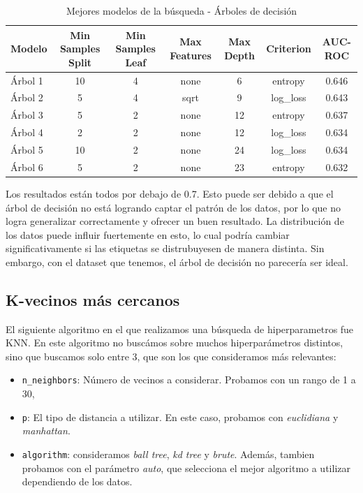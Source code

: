 \begin{table}[H]
    \centering
    \begin{tabular}{|l|c|c|c|c|c|c|}
    \hline
    \textbf{Modelo} & \textbf{Min Samples Split} & \textbf{Min Samples Leaf} & \textbf{Max Features} & \textbf{Max Depth} & \textbf{Criterion} & \textbf{AUC-ROC} \\
    \hline
    \rowcolor{yellow!30}
    Árbol 1 & 10 & 4 & none & 6 & entropy & 0.646 \\
    Árbol 2 & 5 & 4 & sqrt & 9 & log\_loss & 0.643 \\
    Árbol 3 & 5 & 2 & none & 12 & entropy & 0.637 \\
    Árbol 4 & 2 & 2 & none & 12 & log\_loss & 0.634 \\
    Árbol 5 & 10 & 2 & none & 24 & log\_loss & 0.634 \\
    Árbol 6 & 5 & 2 & none & 23 & entropy & 0.632 \\
    \hline
    \end{tabular}
    \caption*{Mejores modelos de la búsqueda - Árboles de decisión}
    \label{tab:hiperparametros-arboles-tabla}
\end{table}

Los resultados están todos por debajo de 0.7. Esto puede ser debido a que
el árbol de decisión no está logrando captar el patrón de los datos, por lo que no logra generalizar correctamente y
ofrecer un buen resultado. La distribución de los datos puede influir fuertemente en esto, lo cual podría cambiar significativamente
si las etiquetas se distrubuyesen de manera distinta. Sin embargo, con el dataset que tenemos, el árbol de decisión no parecería ser ideal.
\subsection*{K-vecinos más cercanos}

El siguiente algoritmo en el que realizamos una búsqueda de hiperparametros fue KNN. En este algoritmo no buscámos sobre
muchos hiperparámetros distintos, sino que buscamos solo entre 3, que son los que consideramos más relevantes:
\begin{itemize}
    \item \texttt{n\_neighbors}: Número de vecinos a considerar. Probamos con un rango de 1 a 30,
    \item \texttt{p}: El tipo de distancia a utilizar. En este caso, probamos con \textit{euclidiana} y \textit{manhattan}.
    \item \texttt{algorithm}: consideramos \textit{ball tree}, \textit{kd tree} y \textit{brute}. Además, tambien probamos con el parámetro \textit{auto}, que selecciona el mejor algoritmo a utilizar dependiendo de los datos.
\end{itemize}

